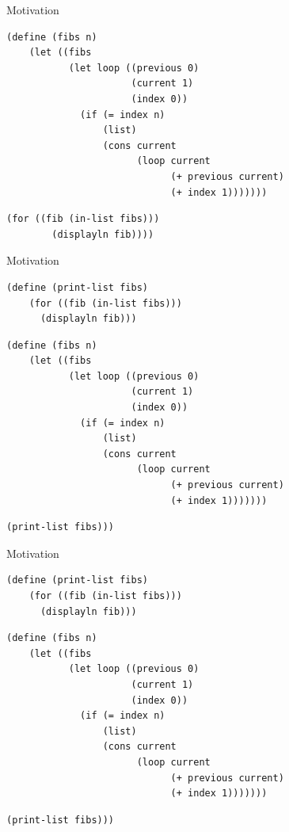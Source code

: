 \documentclass[xcolor=dvipsnames, 14pt]{beamer}
\begin{document}
\begin{frame}[fragile]{Motivation}
\begin{Verbatim}[fontsize=\footnotesize]
  (define (fibs n)
    (let ((fibs
           (let loop ((previous 0)
                      (current 1)
                      (index 0))
             (if (= index n)
                 (list)
                 (cons current
                       (loop current
                             (+ previous current)
                             (+ index 1)))))))
\end{Verbatim}
\begin{Verbatim}[frame=single, rulecolor=\color{red}, fontsize=\footnotesize]
      (for ((fib (in-list fibs)))
        (displayln fib))))
\end{Verbatim}
\end{frame}
\begin{frame}[fragile]{Motivation}

\begin{Verbatim}[frame=single, rulecolor=\color{red}, fontsize=\footnotesize]
  (define (print-list fibs)
    (for ((fib (in-list fibs)))
      (displayln fib)))
\end{Verbatim}
\begin{Verbatim}[fontsize=\footnotesize]
  (define (fibs n)
    (let ((fibs
           (let loop ((previous 0)
                      (current 1)
                      (index 0))
             (if (= index n)
                 (list)
                 (cons current
                       (loop current
                             (+ previous current)
                             (+ index 1)))))))
\end{Verbatim}
\begin{Verbatim}[frame=single, rulecolor=\color{red}, fontsize=\footnotesize]                           
      (print-list fibs)))
\end{Verbatim}
\end{frame}
\begin{frame}[fragile]{Motivation}
\begin{Verbatim}[fontsize=\footnotesize]
  (define (print-list fibs)
    (for ((fib (in-list fibs)))
      (displayln fib)))
\end{Verbatim}
\begin{Verbatim}[frame=single, rulecolor=\color{red},fontsize=\footnotesize]
  (define (fibs n)
    (let ((fibs
           (let loop ((previous 0)
                      (current 1)
                      (index 0))
             (if (= index n)
                 (list)
                 (cons current
                       (loop current
                             (+ previous current)
                             (+ index 1)))))))
\end{Verbatim}
\begin{Verbatim}[fontsize=\footnotesize]                           
      (print-list fibs)))
\end{Verbatim}
\end{frame}
\end{document}
